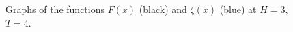 \documentclass[12pt,a4paper]{amsart}
\begin{document}
\begin{figure}[h!]
\begin{minipage}[h]{0.45\linewidth}
\end{minipage}
\hspace{1cm}
\begin{minipage}[h]{0.45\linewidth}
\end{minipage}
\caption{Graphs of the functions $F(x)$ (black) and $\zeta (x)$ (blue) at $H=3,$ $T=4.$} \label{f13}
\end{figure}
\end{document}
